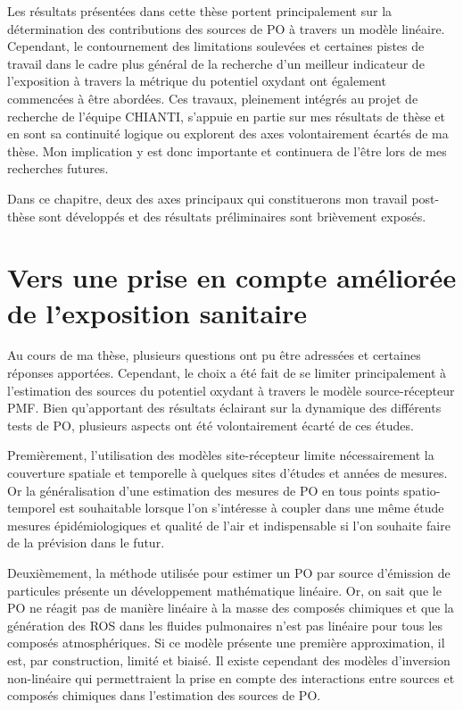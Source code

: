 
Les résultats présentées dans cette thèse portent principalement sur la détermination des contributions des sources de PO à travers un modèle linéaire.
Cependant, le contournement des limitations soulevées et certaines pistes de travail dans le cadre plus général de la recherche d'un meilleur indicateur de l'exposition à travers la métrique du potentiel oxydant ont également commencées à être abordées.
Ces travaux, pleinement intégrés au projet de recherche de l'équipe CHIANTI, s'appuie en partie sur mes résultats de thèse et en sont sa continuité logique ou explorent des axes volontairement écartés de ma thèse.
Mon implication y est donc importante et continuera de l'être lors de mes recherches futures.

Dans ce chapitre, deux des axes principaux qui constituerons mon travail post-thèse sont développés et des résultats préliminaires sont brièvement exposés.

\section{Vers une prise en compte améliorée de l'exposition sanitaire}%

Au cours de ma thèse, plusieurs questions ont pu être adressées et certaines réponses
apportées.  Cependant, le choix a été fait de se limiter principalement à l'estimation
des sources du potentiel oxydant à travers le modèle source-récepteur PMF. Bien qu'apportant des résultats éclairant sur
la dynamique des différents tests de PO, plusieurs aspects ont été volontairement écarté de ces études.

Premièrement, l'utilisation des modèles site-récepteur limite nécessairement la couverture
spatiale et temporelle à quelques sites d'études et années de mesures. Or la
généralisation d'une estimation des mesures de PO en tous points spatio-temporel est
souhaitable lorsque l'on s'intéresse à coupler dans une même étude mesures
épidémiologiques et qualité de l'air et indispensable si l'on souhaite faire de la prévision dans le futur.

Deuxièmement, la méthode utilisée pour estimer un PO par source d'émission de particules présente un
développement mathématique linéaire. Or, on sait que le PO ne réagit pas de manière
linéaire à la masse des composés chimiques et que la génération des ROS dans les fluides pulmonaires n'est pas linéaire pour tous les composés atmosphériques. Si ce modèle présente une première
approximation, il est, par construction, limité et biaisé.  Il existe cependant des
modèles d'inversion non-linéaire qui permettraient la prise en compte des interactions
entre sources et composés chimiques dans l'estimation des sources de PO.


